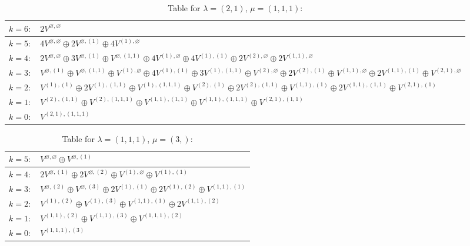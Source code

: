 \renewcommand{\arraystretch}{1.6} 
\begin{table}[H]
\centering
\caption{Table for $\lambda = (2, 1)$, $\mu = (1, 1, 1)$:}
\begin{tabular}{|>{\centering\arraybackslash}p{15cm}|}
\hline
 $k = 6: \quad 2 V^{\varnothing, \varnothing} $ \\ \hline
 $k = 5: \quad 4 V^{\varnothing, \varnothing} \oplus 2 V^{\varnothing, (1)} \oplus 4 V^{(1), \varnothing} $ \\ \hline
 $k = 4: \quad 2 V^{\varnothing, \varnothing} \oplus 3 V^{\varnothing, (1)} \oplus V^{\varnothing, (1, 1)} \oplus 4 V^{(1), \varnothing} \oplus 4 V^{(1), (1)} \oplus 2 V^{(2), \varnothing} \oplus 2 V^{(1, 1), \varnothing} $ \\ \hline
 $k = 3: \quad V^{\varnothing, (1)} \oplus V^{\varnothing, (1, 1)} \oplus V^{(1), \varnothing} \oplus 4 V^{(1), (1)} \oplus 3 V^{(1), (1, 1)} \oplus V^{(2), \varnothing} \oplus 2 V^{(2), (1)} \oplus V^{(1, 1), \varnothing} \oplus 2 V^{(1, 1), (1)} \oplus V^{(2, 1), \varnothing} $ \\ \hline
 $k = 2: \quad V^{(1), (1)} \oplus 2 V^{(1), (1, 1)} \oplus V^{(1), (1, 1, 1)} \oplus V^{(2), (1)} \oplus 2 V^{(2), (1, 1)} \oplus V^{(1, 1), (1)} \oplus 2 V^{(1, 1), (1, 1)} \oplus V^{(2, 1), (1)} $ \\ \hline
 $k = 1: \quad V^{(2), (1, 1)} \oplus V^{(2), (1, 1, 1)} \oplus V^{(1, 1), (1, 1)} \oplus V^{(1, 1), (1, 1, 1)} \oplus V^{(2, 1), (1, 1)} $ \\ \hline
 $k = 0: \quad V^{(2, 1), (1, 1, 1)} $ \\ \hline
\end{tabular}
\end{table}

\renewcommand{\arraystretch}{1.6} 
\begin{table}[H]
\centering
\caption{Table for $\lambda = (1, 1, 1)$, $\mu = (3,)$:}
\begin{tabular}{|>{\centering\arraybackslash}p{15cm}|}
\hline
 $k = 5: \quad V^{\varnothing, \varnothing} \oplus V^{\varnothing, (1)} $ \\ \hline
 $k = 4: \quad 2 V^{\varnothing, (1)} \oplus 2 V^{\varnothing, (2)} \oplus V^{(1), \varnothing} \oplus V^{(1), (1)} $ \\ \hline
 $k = 3: \quad V^{\varnothing, (2)} \oplus V^{\varnothing, (3)} \oplus 2 V^{(1), (1)} \oplus 2 V^{(1), (2)} \oplus V^{(1, 1), (1)} $ \\ \hline
 $k = 2: \quad V^{(1), (2)} \oplus V^{(1), (3)} \oplus V^{(1, 1), (1)} \oplus 2 V^{(1, 1), (2)} $ \\ \hline
 $k = 1: \quad V^{(1, 1), (2)} \oplus V^{(1, 1), (3)} \oplus V^{(1, 1, 1), (2)} $ \\ \hline
 $k = 0: \quad V^{(1, 1, 1), (3)} $ \\ \hline
\end{tabular}
\end{table}

